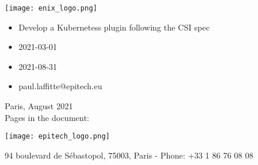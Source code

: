 \pagestyle{fancy}
\thispagestyle{empty}

\begin{spacing}{1.5}
    \center
    \texttt{[image: enix\_logo.png]}\\
    \vspace{0.5 cm}
    {\fontsize{16}{18}\selectfont {}}
\end{spacing}

\vspace{1 cm}
\noindent\begin{minipage}[t]{6cm}
    \begin{itemize}[label=, leftmargin=*, itemsep=0pt]
        \item {} Develop a Kubernetess plugin following the CSI spec
        \item {} 2021-03-01
        \item {} 2021-08-31
        \item {} paul.laffitte@epitech.eu
    \end{itemize}
\end{minipage}
\hfill
\begin{minipage}[t]{5.4cm}
    \begin{flushleft}
        \begin{spacing}{1.8}
            Paris, August 2021\\
            Pages in the document: \pageref{LastPage}
        \end{spacing}
    \end{flushleft}
\end{minipage}

\vspace{1cm}

\begin{flushright}
    {\Huge \title\\}
    \hrulefill \\ \vspace{0.5 cm}
    {\LARGE \subtitle}
\end{flushright}
\vspace{1.5 cm}

\begin{center}
    \texttt{[image: epitech\_logo.png]}
    \vspace{0.5 cm}

    \vspace{4.5cm}

    {\scriptsize 94 boulevard de Sébastopol, 75003, Paris - Phone: +33 1 86 76 08 08}
\end{center}

\newpage
